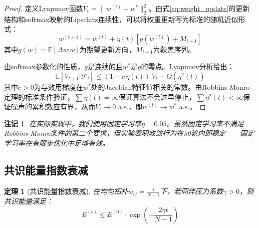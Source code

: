 \documentclass[12pt,a4paper,UTF8,fontset=fandol]{ctexart}
\newtheorem{theorem}{定理}[section]
\newtheorem{remark}{注记}[section]
\begin{document}
\begin{proof}
定义Lyapunov函数$V_t = \|w^{(t)} - w^*\|_2^2$。由式\eqref{eq:weight_update}的更新结构和softmax映射的Lipschitz连续性，可以将权重更新写为标准的随机近似形式：
\begin{equation}
w^{(t+1)} = w^{(t)} + \eta(t) \left[ g(w^{(t)}) + M_{t+1} \right]
\end{equation}
其中$g(w) = \mathbb{E}[\Delta w | w]$为期望更新方向，$M_{t+1}$为鞅差序列。

由softmax参数化的性质，$g$是连续的且$w^*$是$g$的零点。Lyapunov分析给出：
\begin{equation}
\mathbb{E}[V_{t+1} | \mathcal{F}_t] \leq (1 - c\,\eta(t))\,V_t + O(\eta^2(t))
\end{equation}
其中$c > 0$为与效用梯度在$w^*$处的Jacobian特征值相关的常数。由Robbins-Monro定理的标准条件验证，$\sum \eta(t) = \infty$保证算法不会过早停止，$\sum \eta^2(t) < \infty$保证噪声的累积效应有界，从而$V_t \to 0$ a.s.，即$w^{(t)} \to w^*$ a.s.。
\end{proof}

\begin{remark}
在实际实现中，我们使用固定学习率$\eta = 0.05$。虽然固定学习率不满足Robbins-Monro条件的第二个要求，但实验表明收敛行为在30轮内即稳定——固定学习率在有限步优化中足够有效。
\end{remark}

\subsection{共识能量指数衰减}

\begin{theorem}[共识能量指数衰减]\label{thm:energy}
在均匀拓扑$w_{ij} = \frac{1}{N-1}$下，若同伴压力系数$\gamma > 0$，则共识能量满足：
\begin{equation}
E^{(t)} \leq E^{(0)} \cdot \exp\!\left(-\frac{2\gamma t}{N-1}\right)
\end{equation}
\end{theorem}
\end{document}
